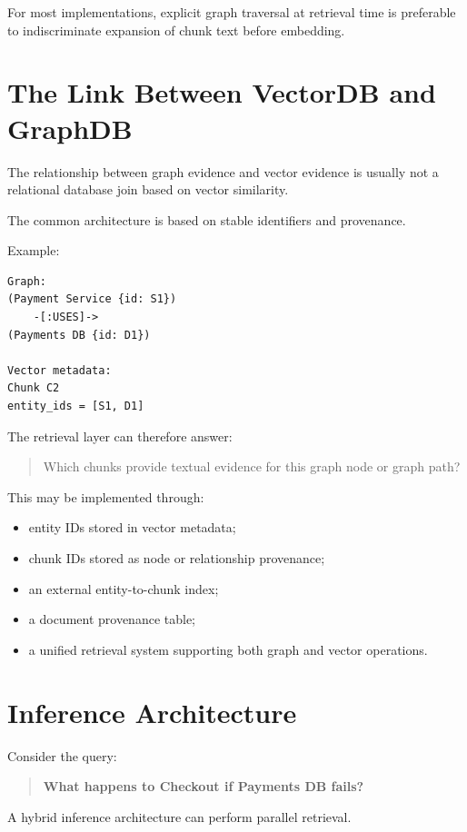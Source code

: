 \documentclass[11pt,a4paper]{article}
\begin{document}
For most implementations, explicit graph traversal at retrieval time is preferable to indiscriminate expansion of chunk text before embedding.

\section{The Link Between VectorDB and GraphDB}

The relationship between graph evidence and vector evidence is usually not a relational database join based on vector similarity.

The common architecture is based on stable identifiers and provenance.

Example:

\begin{lstlisting}
Graph:
(Payment Service {id: S1})
    -[:USES]->
(Payments DB {id: D1})

Vector metadata:
Chunk C2
entity_ids = [S1, D1]
\end{lstlisting}

The retrieval layer can therefore answer:

\begin{quote}
Which chunks provide textual evidence for this graph node or graph path?
\end{quote}

This may be implemented through:

\begin{itemize}
\item entity IDs stored in vector metadata;
\item chunk IDs stored as node or relationship provenance;
\item an external entity-to-chunk index;
\item a document provenance table;
\item a unified retrieval system supporting both graph and vector operations.
\end{itemize}

\section{Inference Architecture}

Consider the query:

\begin{quote}
\textbf{What happens to Checkout if Payments DB fails?}
\end{quote}

A hybrid inference architecture can perform parallel retrieval.
\end{document}

